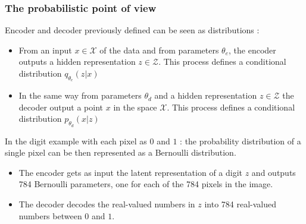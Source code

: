 \documentclass[french,9pt]{beamer}
\begin{document}
\begin{frame}
\frametitle{The probabilistic point of view}

Encoder and decoder previously defined can be seen as distributions : 
\begin{itemize}
\item From an input $x \in \mathcal{X}$ of the data and from parameters $\theta_{e}$, the encoder outputs a hidden representation $z \in \mathcal{Z}$. This process defines a conditional distribution $q_{\theta_{e}}(z|x)$
\item In the same way from parameters $\theta_{d}$ and a hidden representation $z \in \mathcal{Z}$ the decoder output a point $x$ in the space $\mathcal{X}$. This process defines a conditional distribution $p_{\theta_{d}}(x|z)$
\end{itemize}


In the digit example with each pixel as $0$ and $1$ : the probability distribution of a single pixel can be then represented as a Bernoulli distribution. 
\begin{itemize}
\item The encoder gets as input the latent representation of a digit $z$ and outputs 784 Bernoulli parameters, one for each of the 784 pixels in the image.
\item  The decoder decodes the real-valued numbers in $z$ into 784 real-valued numbers between $0$ and $1$.
\end{itemize}


\end{frame}

\end{document}
